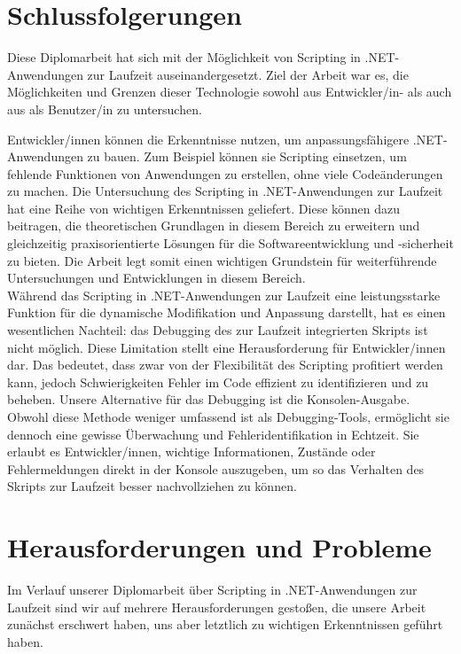 \section{Schlussfolgerungen}

Diese Diplomarbeit hat sich mit der Möglichkeit von Scripting in .NET-Anwendungen zur 
Laufzeit auseinandergesetzt. Ziel der Arbeit war es, die Möglichkeiten und Grenzen dieser 
Technologie sowohl aus Entwickler/in- als auch aus als Benutzer/in zu untersuchen.

Entwickler/innen können die Erkenntnisse nutzen, um anpassungsfähigere .NET-Anwendungen zu bauen. 
Zum Beispiel können sie Scripting einsetzen, um fehlende Funktionen von Anwendungen zu erstellen, 
ohne viele Codeänderungen zu machen. Die Untersuchung des Scripting in .NET-Anwendungen zur 
Laufzeit hat eine Reihe von wichtigen Erkenntnissen geliefert. 
Diese können dazu beitragen, die theoretischen Grundlagen in diesem Bereich zu erweitern 
und gleichzeitig praxisorientierte Lösungen für die Softwareentwicklung und -sicherheit zu bieten.
Die Arbeit legt somit einen wichtigen Grundstein für weiterführende 
Untersuchungen und Entwicklungen in diesem Bereich.\\

Während das Scripting in .NET-Anwendungen zur Laufzeit eine leistungsstarke Funktion für die 
dynamische Modifikation und Anpassung darstellt, hat es einen wesentlichen Nachteil: 
das Debugging des zur Laufzeit integrierten Skripts ist nicht möglich. Diese Limitation 
stellt eine Herausforderung für Entwickler/innen dar. Das bedeutet, dass zwar von der Flexibilität 
des Scripting profitiert werden kann, jedoch Schwierigkeiten Fehler im Code effizient zu 
identifizieren und zu beheben. Unsere Alternative für das Debugging ist die Konsolen-Ausgabe. 
Obwohl diese Methode weniger umfassend ist als Debugging-Tools, ermöglicht sie dennoch eine 
gewisse Überwachung und Fehleridentifikation in Echtzeit. Sie erlaubt es Entwickler/innen, 
wichtige Informationen, Zustände oder Fehlermeldungen direkt in der Konsole auszugeben, 
um so das Verhalten des Skripts zur Laufzeit besser nachvollziehen zu können.

\newpage
\section{Herausforderungen und Probleme}

Im Verlauf unserer Diplomarbeit über Scripting in .NET-Anwendungen zur Laufzeit sind wir 
auf mehrere Herausforderungen gestoßen, die unsere Arbeit zunächst erschwert haben, 
uns aber letztlich zu wichtigen Erkenntnissen geführt haben.

